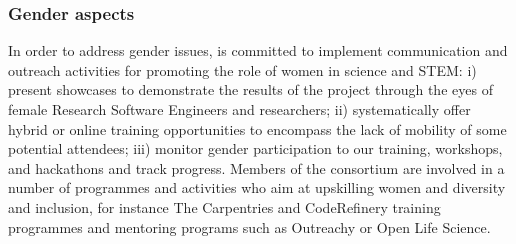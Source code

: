 \subsubsection{Gender aspects}\label{sec:gender}

In order to address gender issues, \TheProject is committed to implement communication and outreach activities for promoting the role of women in science and STEM: i) present showcases to demonstrate the results of the project through the eyes of female Research Software Engineers and researchers; ii) systematically offer hybrid or online training opportunities to encompass the lack of mobility of some potential attendees; iii) monitor gender participation to our training, workshops, and hackathons and track progress.
Members of the consortium are involved in a number of programmes and activities who aim at upskilling women and diversity and inclusion, for instance The Carpentries and CodeRefinery training programmes and mentoring programs such as Outreachy or Open Life Science.



